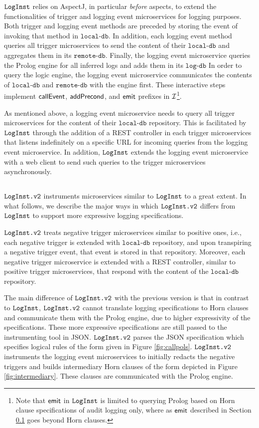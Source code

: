 $\texttt{LogInst}$ relies on AspectJ, in particular \emph{before} aspects,  to extend the functionalities of trigger and logging event microservices for logging purposes. Both trigger and logging event methods are preceded by storing the event of invoking that method in $\texttt{local-db}$. In addition, each logging event method queries all trigger microservices to send the content of their $\texttt{local-db}$ and aggregates them in its $\texttt{remote-db}$. Finally, the logging event microservice queries the Prolog engine for all inferred logs and adds them in its $\texttt{log-db}$ In order to query the logic engine, the logging event microservice communicates the contents of $\texttt{local-db}$ and $\texttt{remote-db}$ with the engine first. These interactive steps implement $\mathsf{callEvent}$, $\mathsf{addPrecond}$, and $\mathsf{emit}$ prefixes in $\mathcal{I}$\footnote{Note that $\mathsf{emit}$ in $\texttt{LogInst}$ is limited to querying Prolog based on Horn clause specifications of audit logging only, where as $\mathsf{emit}$ described in Section \ref{} goes beyond Horn clauses.}. 

As mentioned above, a logging event microservice needs to query all trigger microservices for the content of their $\texttt{local-db}$ repository. This is facilitated by $\texttt{LogInst}$ through the addition of a REST controller in each trigger microservices that listens indefinitely on a specific URL for incoming queries from the logging event microservice. In addition, $\texttt{LogInst}$ extends the logging event microservice with a web client to send such queries to the trigger microservices asynchronously.



\subsection{\tooll}
$\texttt{LogInst.v2}$ instruments microservices similar to $\texttt{LogInst}$ to a great extent. In what follows, we describe the major ways in which $\texttt{LogInst.v2}$ differs from $\texttt{LogInst}$ to support more expressive logging specifications.

$\texttt{LogInst.v2}$ treats negative trigger microservices similar to positive ones, i.e., each negative trigger is extended with $\texttt{local-db}$ repository, and upon transpiring a negative trigger event, that event is stored in that repository. Moreover, each negative trigger microservice is extended with a REST controller, similar to positive trigger microservices, that respond with the content of the $\texttt{local-db}$ repository. 

The main difference of $\texttt{LogInst.v2}$ with the previous version is that in contrast to $\texttt{LogInst}$, $\texttt{LogInst.v2}$ cannot translate logging specifications to Horn clauses and communicate them with the Prolog engine, due to higher expressivity of the specifications. These more expressive specifications are still passed to the instrumenting tool in JSON. $\texttt{LogInst.v2}$ parses the JSON specification which specifies logical rules of the form given in Figure \ref{fig:callpols}. $\texttt{LogInst.v2}$ instruments the logging event microservices to initially redacts the negative triggers and builds intermediary Horn clauses of the form depicted in Figure \ref{fig:intermediary}. These clauses are communicated with the Prolog engine. 


